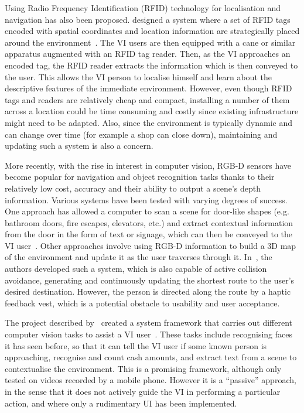 \documentclass[letterpaper]{article}
\begin{document}
Using Radio Frequency Identification (RFID) technology for localisation and navigation has also been proposed. \citeauthor{willis2005} designed a system where a set of RFID tags encoded with spatial coordinates and location information are strategically placed around the environment~\cite{willis2005}. The VI users are then equipped with a cane or similar apparatus augmented with an RFID tag reader. Then, as the VI approaches an encoded tag, the RFID reader extracts the information which is then conveyed to the user. This allows the VI person to localise himself and learn about the descriptive features of the immediate environment. However, even though RFID tags and readers are relatively cheap and compact, installing a number of them across a location could be time consuming and costly since existing infrastructure might need to be adapted. Also, since the environment is typically dynamic and can change over time (for example a shop can close down), maintaining and updating such a system is also a concern.

More recently, with the rise in interest in computer vision, RGB-D sensors have become popular for navigation and object recognition tasks thanks to their relatively low cost, accuracy and their ability to output a scene's depth information. Various systems have been tested with varying degrees of success. One approach has allowed a computer to scan a scene for door-like shapes (e.g. bathroom doors, fire escapes, elevators, etc.) and extract contextual information from the door in the form of text or signage, which can then be conveyed to the VI user~\cite{tian2013b}. Other approaches involve using RGB-D information to build a 3D map of the environment and update it as the user traverses through it. In~\citeauthor{lee2015}, \citeyear{lee2015} the authors developed such a system, which is also capable of active collision avoidance, generating and continuously updating the shortest route to the user's desired destination. However, the person is directed along the route by a haptic feedback vest, which is a potential obstacle to usability and user acceptance.

The project described by~\citeauthor{chessa2016} created a system framework that carries out different computer vision tasks to assist a VI user~\cite{chessa2016}. These tasks include recognising faces it has seen before, so that it can tell the VI user if some known person is approaching, recognise and count cash amounts, and extract text from a scene to contextualise the environment. This is a promising framework, although only tested on videos recorded by a mobile phone. However it is a ``passive'' approach, in the sense that it does not actively guide the VI in performing a particular action, and where only a rudimentary UI has been implemented.
\end{document}
